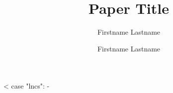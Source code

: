 \documentclass[runningheads,a4paper,english]{llncs}[2018/03/10]
\begin{document}
<%
  case "lncs": -%

\title{Paper Title}

\author{Firstname Lastname \and Firstname Lastname}



%
%

\maketitle
\end{document}
